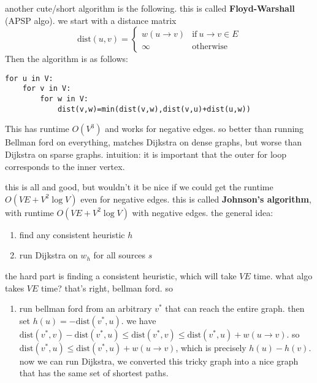     another cute/short algorithm is the following. this is called \textbf{Floyd-Warshall} (APSP algo). we start with a distance matrix 
    \[
    \mathrm{dist}(u,v)=
    \begin{cases}
        w(u \to v) & \text{if} \ u \to v \in E\\
        \infty & \text{otherwise} 
    \end{cases}
    \] Then the algorithm is as follows:
    \begin{verbatim}
for u in V:
    for v in V:
        for w in V:
            dist(v,w)=min(dist(v,w),dist(v,u)+dist(u,w))
    \end{verbatim} This has runtime $O(V^3)$ and works for negative edges. so better than running Bellman ford on everything, matches Dijkstra on dense graphs, but worse than Dijkstra on sparse graphs. intuition: it is important that the outer for loop corresponds to the inner vertex.

    this is all and good, but wouldn't it be nice if we could get the runtime $O(VE+V^2 \log V)$ even for negative edges. this is called \textbf{Johnson's algorithm}, with runtime $O(VE+V^2 \log V)$ with negative edges. the general idea:
    \begin{enumerate}[label=(\arabic*)]
    \setlength\itemsep{-.2em}
\item find any consistent heuristic $h$ 
\item run Dijkstra on $w_h$ for all sources $s$
    \end{enumerate}the hard part is finding a consistent heuristic, which will take $VE$ time. what algo takes $VE$ time? that's right, bellman ford. so 
    \begin{enumerate}[label=(\arabic*)]
    \setlength\itemsep{-.2em}
\item run bellman ford from an arbitrary $v^*$ that can reach the entire graph. then set $h(u)=-\mathrm{dist}(v^*,u)$. we have $\mathrm{dist}(v^*,v)-\mathrm{dist}(v^*,u) \leq \mathrm{dist}(v^*,v) \leq \mathrm{dist}(v^*,u)+w(u \to v)$. so $\mathrm{dist}(v^*,u) \leq \mathrm{dist}(v^*,u)+w (u \to v)$, which is precisely $h(u)-h(v)$. now we can run Dijkstra, we converted this tricky graph into a nice graph that has the same set of shortest paths.
    \end{enumerate}
